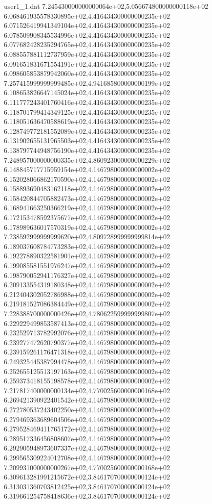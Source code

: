 \begin{filecontents}{user1_1.dat}
7.245430000000000064e+02,5.056674800000000118e+02
6.068461935578330895e+02,4.416434300000000235e+02
6.071526419941349104e+02,4.416434300000000235e+02
6.078509908345534996e+02,4.416434300000000235e+02
6.077682428235294765e+02,4.416434300000000235e+02
6.088557881112737959e+02,4.416434300000000235e+02
6.091651831671554191e+02,4.416434300000000235e+02
6.098605853879942060e+02,4.416434300000000235e+02
7.257415999999999485e+02,4.941685800000000199e+02
6.108653826647145024e+02,4.416434300000000235e+02
6.111777243401760416e+02,4.416434300000000235e+02
6.118701799414349125e+02,4.416434300000000235e+02
6.118051636470588619e+02,4.416434300000000235e+02
6.128749772181552089e+02,4.416434300000000235e+02
6.131902655131965503e+02,4.416434300000000235e+02
6.138797744948756190e+02,4.416434300000000235e+02
7.248957000000000335e+02,4.860923000000000229e+02
6.148845717715959154e+02,4.146798000000000002e+02
6.152028066862170590e+02,4.146798000000000002e+02
6.158893690483162118e+02,4.146798000000000002e+02
6.158420844705882473e+02,4.146798000000000002e+02
6.168941663250366219e+02,4.146798000000000002e+02
6.172153478592375677e+02,4.146798000000000002e+02
6.178989636017570319e+02,4.146798000000000002e+02
7.238592999999999620e+02,4.809728999999999814e+02
6.189037608784773283e+02,4.146798000000000002e+02
6.192278890322581901e+02,4.146798000000000002e+02
6.199085581551976247e+02,4.146798000000000002e+02
6.198790052941176327e+02,4.146798000000000002e+02
6.209133554319180348e+02,4.146798000000000002e+02
6.212404302052786988e+02,4.146798000000000002e+02
6.219181527086384449e+02,4.146798000000000002e+02
7.228388700000000426e+02,4.780622599999999807e+02
6.229229499853587413e+02,4.146798000000000002e+02
6.232529713782992076e+02,4.146798000000000002e+02
6.239277472620790377e+02,4.146798000000000002e+02
6.239159261176471318e+02,4.146798000000000002e+02
6.249325445387994478e+02,4.146798000000000002e+02
6.252655125513197163e+02,4.146798000000000002e+02
6.259373418155198578e+02,4.146798000000000002e+02
7.217817400000000134e+02,4.770025600000000168e+02
6.269421390922401542e+02,4.146798000000000002e+02
6.272780537243402250e+02,4.146798000000000002e+02
6.279469363689604506e+02,4.146798000000000002e+02
6.279528469411765172e+02,4.146798000000000002e+02
6.289517336456808607e+02,4.146798000000000002e+02
6.292905948973607337e+02,4.146798000000000002e+02
6.299565309224012708e+02,4.146798000000000002e+02
7.209931000000000267e+02,4.770025600000000168e+02
6.309613281991215672e+02,3.846170700000000124e+02
6.313031360703812425e+02,3.846170700000000124e+02
6.319661254758418636e+02,3.846170700000000124e+02

\end{filecontents}
